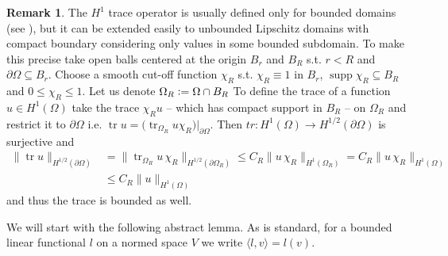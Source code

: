 \documentclass[12pt,a4paper]{article}
\numberwithin{equation}{subsection}
\numberwithin{lemma}{subsection}
\theoremstyle{definition}
\newtheorem{remark}[lemma]{Remark}
\DeclareMathOperator{\supp}{supp}
\DeclareMathOperator{\tr}{tr}
\begin{document}
\begin{remark}
    The $H^1$ trace operator is usually defined only for bounded domains 
    (see \cite[Thm.\,3.9]{monk}), but it can be extended easily to unbounded Lipschitz domains with 
    compact boundary considering only values in some bounded subdomain. 
    To make this precise take open balls centered at the origin $B_r$ and 
    $B_R$ s.t. $r < R$ and $\partial \Omega \subseteq B_r$. Choose 
    a smooth cut-off function $\chi_R$ s.t. $\chi_R \equiv 1$ in $B_r$, 
    $\supp \chi_R \subseteq B_R$ and $0 \leq \chi_R \leq 1$. Let us denote 
    $\Omega_R \vcentcolon=  \Omega \cap B_R$
    To define the trace of a function $u \in H^1(\Omega)$ take the trace 
    $\chi_R u$ -- which has compact support in $B_R$ -- 
    on $\Omega_R$ and restrict it to $\partial \Omega$ 
    i.e. $\tr u = \big( \tr_{\Omega_R} u\chi_R \big)|_{\partial \Omega}$.
    Then $tr: H^1(\Omega) \rightarrow H^{1/2}(\partial \Omega)$ is 
    surjective and
    \begin{align*}
        \lVert \tr u \rVert _{H^{1/2}(\partial \Omega)}
        &= \lVert \tr_{\Omega_R} u\,\chi_R  \rVert _{H^{1/2}(\partial \Omega_R)}
        \leq C_R \lVert u\,\chi_R  \rVert _{H^1(\Omega_R)}
        = C_R \lVert u\,\chi_R  \rVert _{H^1(\Omega)}
        \\ &\leq C_R \lVert u  \rVert _{H^1(\Omega)}
    \end{align*}
    and thus the trace is bounded as well.
\end{remark}

We will start with the following abstract lemma. As is standard, for a bounded linear 
functional $l$ on a normed space $V$ we write $\langle l, v \rangle = l(v)$. 
\end{document}

